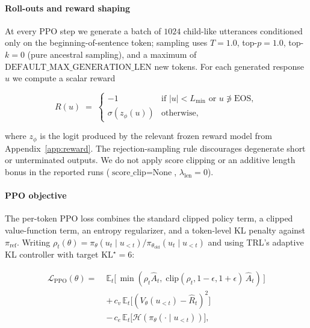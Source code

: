 \iffalse

\paragraph{Roll-outs and reward shaping}
\label{app:rl-rollouts}

At every PPO step we generate a batch of $1024$ child-like utterances conditioned only on the beginning-of-sentence token; sampling uses $T = 1.0$, top-$p = 1.0$, top-$k = 0$ (pure ancestral sampling), and a maximum of $\text{DEFAULT\_MAX\_GENERATION\_LEN}$ new tokens.  For each generated response $u$ we compute a scalar reward

\begin{equation}
\label{eq:reward}
R(u) \;=\;
\begin{cases}
-1 & \text{if } |u| < L_{\min} \text{ or } u \not\ni \text{EOS},\\[2pt]
\sigma(z_\phi(u)) & \text{otherwise},
\end{cases}
\end{equation}

where $z_\phi$ is the logit produced by the relevant frozen reward model from Appendix~\ref{app:reward}.  The rejection-sampling rule discourages degenerate short or unterminated outputs.  We do not apply score clipping or an additive length bonus in the reported runs ($\text{score\_clip}\!=\!\text{None}$, $\lambda_{\text{len}}\!=\!0$).

\paragraph{PPO objective}
\label{app:rl-objective}

The per-token PPO loss combines the standard clipped policy term, a clipped value-function term, an entropy regularizer, and a token-level KL penalty against $\pi_{\text{ref}}$.  Writing $\rho_t(\theta) = \pi_\theta(u_t \mid u_{<t}) / \pi_{\theta_{\text{old}}}(u_t \mid u_{<t})$ and using TRL's adaptive KL controller with target $\text{KL}^\star\!=\!6$:

\begin{align}
\mathcal{L}_{\text{PPO}}(\theta) =\;& 
\mathbb{E}_t \big[\, \min(\rho_t \hat{A}_t,\; \text{clip}(\rho_t, 1{-}\epsilon, 1{+}\epsilon)\,\hat{A}_t) \,\big] \nonumber \\
&+\, c_v\, \mathbb{E}_t \big[(V_\theta(u_{<t}) - \hat{R}_t)^2\big] \nonumber \\
&-\, c_e\, \mathbb{E}_t\big[ \mathcal{H}(\pi_\theta(\cdot\mid u_{<t})) \big],
\end{align}

